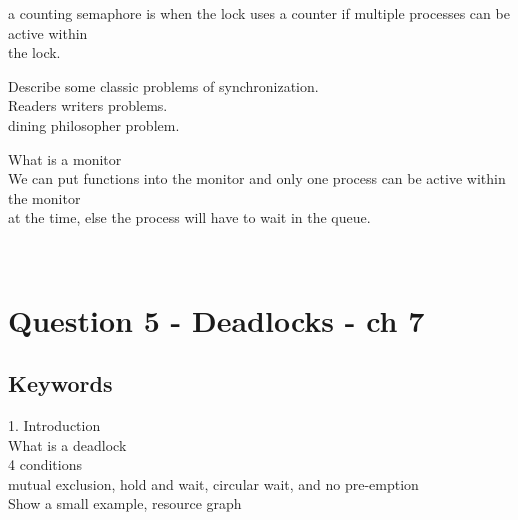 \documentclass[a4paper,10pt,titlepage]{report}
\begin{document}
\hspace{10mm}  a counting semaphore is when the lock uses a counter if multiple processes can be active within \\
\hspace{10mm}  the lock. \\

\vspace{5mm}



Describe some classic problems of synchronization. \\

\hspace{10mm}  Readers writers problems.\\
\hspace{10mm} dining philosopher problem. \\
\vspace{5mm}




What is a monitor \\
\hspace{10mm}  We can put functions into the monitor and only one process can be active within the monitor \\
\hspace{10mm} at the time, else the process will have to wait in the queue.






\

\newpage
\section{Question 5 - Deadlocks - ch 7}
\subsection{Keywords}
1. Introduction\\
\hspace{10mm} What is a deadlock\\
\hspace{10mm} 4 conditions \\
\hspace{20mm} mutual exclusion, hold and wait, circular wait, and no pre-emption \\
\hspace{20mm} Show a small example, resource graph \\
\vspace{5mm}
\end{document}
